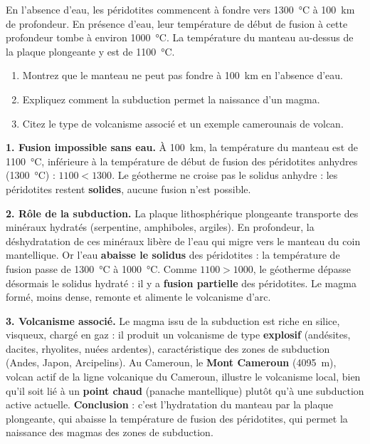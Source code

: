 \documentclass[11pt]{article}
\begin{document}
\begin{exoresolu}
En l'absence d'eau, les péridotites commencent à fondre vers \SI{1300}{\celsius} à \SI{100}{km} de profondeur. En présence d'eau, leur température de début de fusion à cette profondeur tombe à environ \SI{1000}{\celsius}. La température du manteau au-dessus de la plaque plongeante y est de \SI{1100}{\celsius}.
\begin{enumerate}
\item Montrez que le manteau ne peut pas fondre à \SI{100}{km} en l'absence d'eau.
\item Expliquez comment la subduction permet la naissance d'un magma.
\item Citez le type de volcanisme associé et un exemple camerounais de volcan.
\end{enumerate}
\tcblower
\textbf{1. Fusion impossible sans eau.} À \SI{100}{km}, la température du manteau est de \SI{1100}{\celsius}, inférieure à la température de début de fusion des péridotites anhydres (\SI{1300}{\celsius}) : $1100 < 1300$. Le géotherme ne croise pas le solidus anhydre : les péridotites restent \textbf{solides}, aucune fusion n'est possible.

\textbf{2. Rôle de la subduction.} La plaque lithosphérique plongeante transporte des minéraux hydratés (serpentine, amphiboles, argiles). En profondeur, la déshydratation de ces minéraux libère de l'eau qui migre vers le manteau du coin mantellique. Or l'eau \textbf{abaisse le solidus} des péridotites : la température de fusion passe de \SI{1300}{\celsius} à \SI{1000}{\celsius}. Comme $1100 > 1000$, le géotherme dépasse désormais le solidus hydraté : il y a \textbf{fusion partielle} des péridotites. Le magma formé, moins dense, remonte et alimente le volcanisme d'arc.

\textbf{3. Volcanisme associé.} Le magma issu de la subduction est riche en silice, visqueux, chargé en gaz : il produit un volcanisme de type \textbf{explosif} (andésites, dacites, rhyolites, nuées ardentes), caractéristique des zones de subduction (Andes, Japon, Arcipelins). Au Cameroun, le \textbf{Mont Cameroun} (\SI{4095}{m}), volcan actif de la ligne volcanique du Cameroun, illustre le volcanisme local, bien qu'il soit lié à un \textbf{point chaud} (panache mantellique) plutôt qu'à une subduction active actuelle.
\textbf{Conclusion} : c'est l'hydratation du manteau par la plaque plongeante, qui abaisse la température de fusion des péridotites, qui permet la naissance des magmas des zones de subduction.
\end{exoresolu}
\end{document}
